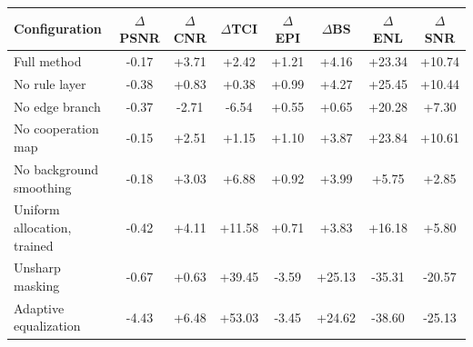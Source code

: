 \begin{tabular}{lccccccc}
\toprule
Configuration & $\Delta$PSNR & $\Delta$CNR & $\Delta$TCI & $\Delta$EPI & $\Delta$BS & $\Delta$ENL & $\Delta$SNR \\
\midrule
Full method & -0.17 & +3.71 & +2.42 & +1.21 & +4.16 & +23.34 & +10.74 \\
No rule layer & -0.38 & +0.83 & +0.38 & +0.99 & +4.27 & +25.45 & +10.44 \\
No edge branch & -0.37 & -2.71 & -6.54 & +0.55 & +0.65 & +20.28 & +7.30 \\
No cooperation map & -0.15 & +2.51 & +1.15 & +1.10 & +3.87 & +23.84 & +10.61 \\
No background smoothing & -0.18 & +3.03 & +6.88 & +0.92 & +3.99 & +5.75 & +2.85 \\
\midrule
Uniform allocation, trained & -0.42 & +4.11 & +11.58 & +0.71 & +3.83 & +16.18 & +5.80 \\
Unsharp masking & -0.67 & +0.63 & +39.45 & -3.59 & +25.13 & -35.31 & -20.57 \\
Adaptive equalization & -4.43 & +6.48 & +53.03 & -3.45 & +24.62 & -38.60 & -25.13 \\
\bottomrule
\end{tabular}
